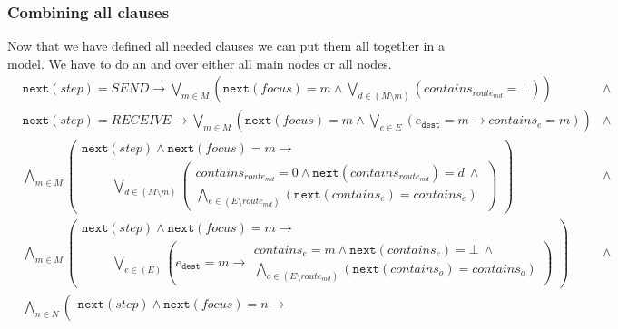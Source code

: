 \documentclass[12pt]{scrartcl}
\newcommand{\mtt}[1]{\ensuremath{\mathtt{#1}}}
\newcommand{\nt}[1]{\ensuremath{\mtt{next}(#1)}}
\begin{document}
\subsubsection{Combining all clauses}
Now that we have defined all needed clauses we can put them all together in a model. We have to do an and over either all main nodes or all nodes.
\begin{align*}
    &\nt{step} = SEND \rightarrow \bigvee_{m\in M}\left( \nt{focus} = m \wedge \bigvee_{d\in (M\setminus m)}\left(contains_{route_{md}} = \bot\right)\right) & \wedge \\
    &\nt{step} = RECEIVE \rightarrow \bigvee_{m\in M}\left( \nt{focus} = m \wedge \bigvee_{e\in E}\left(e_{\mtt{dest}} = m \rightarrow contains_{e} = m\right)\right)  & \wedge \\
    &\bigwedge_{m\in M} \left(
        \begin{array}{l}
            \nt{step} \wedge \nt{focus} = m \rightarrow \\
            \hspace{1cm}\bigvee_{d\in (M\setminus m)}\left(
                \begin{array}{l}
                    contains_{route_{md}} = 0 \wedge \nt{contains_{route_{md}}} = d\ \wedge \\
                    \bigwedge_{e\in (E\setminus route_{md})}\left( \nt{contains_e} = contains_e\right)
                \end{array}
                \right)
        \end{array}
    \right) &\wedge \\
    &\bigwedge_{m\in M} \left(
        \begin{array}{l}
            \nt{step} \wedge \nt{focus} = m \rightarrow \\
            \hspace{1cm}\bigvee_{e\in (E)}\left( e_{\mtt{dest}} = m \rightarrow
                \begin{array}{l}
                    contains_{e} = m \wedge \nt{contains_{e}} = \bot\ \wedge \\
                    \bigwedge_{o\in (E\setminus route_{md})}\left( \nt{contains_o} = contains_o\right)
                \end{array}
            \right)
        \end{array}
    \right) &\wedge \\
    &\bigwedge_{n\in N} \left(
        \begin{array}{l}
            \nt{step} \wedge \nt{focus} = n \rightarrow \\

\end{array}
\end{align*}
\end{document}
